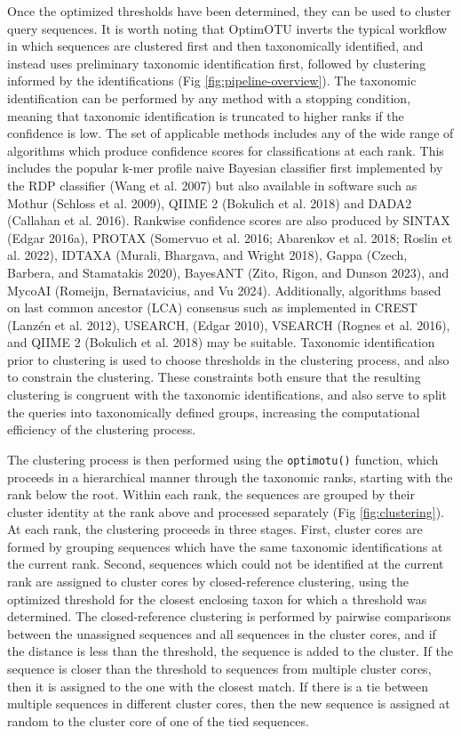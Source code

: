 \documentclass[
]{article}
\begin{document}
Once the optimized thresholds have been determined, they can be used to cluster query sequences.
It is worth noting that OptimOTU inverts the typical workflow in which sequences are clustered first and then taxonomically identified, and instead uses preliminary taxonomic identification first, followed by clustering informed by the identifications (Fig \ref{fig:pipeline-overview}).
The taxonomic identification can be performed by any method with a stopping condition, meaning that taxonomic identification is truncated to higher ranks if the confidence is low.
The set of applicable methods includes any of the wide range of algorithms which produce confidence scores for classifications at each rank.
This includes the popular k-mer profile naive Bayesian classifier first implemented by the RDP classifier (Wang et al. 2007) but also available in software such as Mothur (Schloss et al. 2009), QIIME 2 (Bokulich et al. 2018) and DADA2 (Callahan et al. 2016).
Rankwise confidence scores are also produced by SINTAX (Edgar 2016a), PROTAX (Somervuo et al. 2016; Abarenkov et al. 2018; Roslin et al. 2022), IDTAXA (Murali, Bhargava, and Wright 2018), Gappa (Czech, Barbera, and Stamatakis 2020), BayesANT (Zito, Rigon, and Dunson 2023), and MycoAI (Romeijn, Bernatavicius, and Vu 2024).
Additionally, algorithms based on last common ancestor (LCA) consensus such as implemented in CREST (Lanzén et al. 2012), USEARCH, (Edgar 2010), VSEARCH (Rognes et al. 2016), and QIIME 2 (Bokulich et al. 2018) may be suitable.
Taxonomic identification prior to clustering is used to choose thresholds in the clustering process, and also to constrain the clustering.
These constraints both ensure that the resulting clustering is congruent with the taxonomic identifications, and also serve to split the queries into taxonomically defined groups, increasing the computational efficiency of the clustering process.

The clustering process is then performed using the \texttt{optimotu()} function, which proceeds in a hierarchical manner through the taxonomic ranks, starting with the rank below the root.
Within each rank, the sequences are grouped by their cluster identity at the rank above and processed separately (Fig \ref{fig:clustering}).
At each rank, the clustering proceeds in three stages.
First, cluster cores are formed by grouping sequences which have the same taxonomic identifications at the current rank.
Second, sequences which could not be identified at the current rank are assigned to cluster cores by closed-reference clustering, using the optimized threshold for the closest enclosing taxon for which a threshold was determined.
The closed-reference clustering is performed by pairwise comparisons between the unassigned sequences and all sequences in the cluster cores, and if the distance is less than the threshold, the sequence is added to the cluster.
If the sequence is closer than the threshold to sequences from multiple cluster cores, then it is assigned to the one with the closest match.
If there is a tie between multiple sequences in different cluster cores, then the new sequence is assigned at random to the cluster core of one of the tied sequences.
\end{document}
